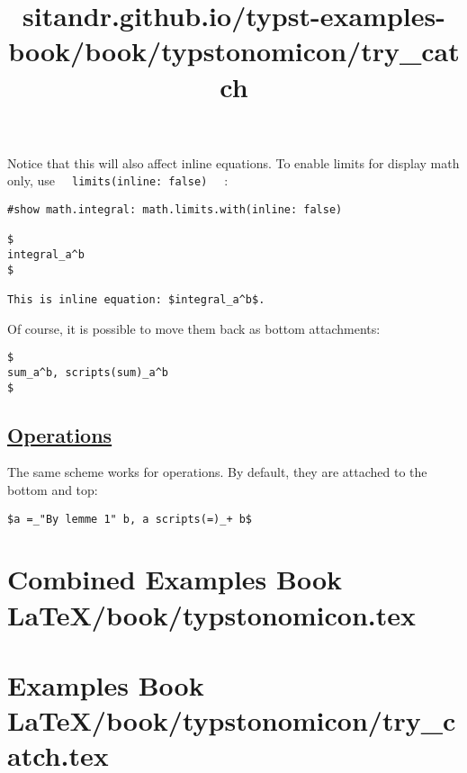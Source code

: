 Notice that this will also affect inline equations. To enable limits for
display math only, use
\texttt{\ }{\texttt{\ limits(inline:\ false)\ }}\texttt{\ } :

\begin{verbatim}
#show math.integral: math.limits.with(inline: false)

$
integral_a^b
$

This is inline equation: $integral_a^b$.
\end{verbatim}

\pandocbounded{}

Of course, it is possible to move them back as bottom attachments:

\begin{verbatim}
$
sum_a^b, scripts(sum)_a^b
$
\end{verbatim}

\pandocbounded{}

\subsection{\texorpdfstring{\hyperref[operations]{Operations}}{Operations}}\label{operations}

The same scheme works for operations. By default, they are attached to
the bottom and top:

\begin{verbatim}
$a =_"By lemme 1" b, a scripts(=)_+ b$
\end{verbatim}

\pandocbounded{}






\section{Combined Examples Book LaTeX/book/typstonomicon.tex}
\section{Examples Book LaTeX/book/typstonomicon/try_catch.tex}
\title{sitandr.github.io/typst-examples-book/book/typstonomicon/try_catch}

